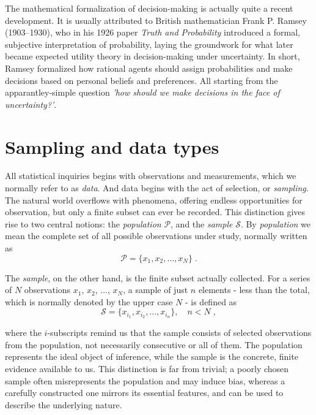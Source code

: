 \documentclass{book}
\begin{document}
\medskip

The mathematical formalization of decision-making is actually quite a recent development. It is usually attributed to British mathematician Frank P. Ramsey (1903–1930), who in his 1926 paper \textit{Truth and Probability} \cite{ramsey1926} introduced a formal, subjective interpretation of probability, laying the groundwork for what later became expected utility theory in decision-making under uncertainty. In short, Ramsey formalized how rational agents should assign probabilities and make decisions based on personal beliefs and preferences. All starting from the apparantley-simple question \textit{'how should we make decisions in the face of uncertainty?'}.\\

\section{Sampling and data types}
 
All statistical inquiries begins with observations and measurements, which we normally refer to as \textit{data}. And data begins with the act of selection, or \textit{sampling}. The natural world overflows with phenomena, offering endless opportunities for observation, but only a finite subset can ever be recorded. This distinction gives rise to two central notions: the \textit{population} $\mathcal{P}$, and the \textit{sample} $\mathcal{S}$. By \textit{population} we mean the complete set of all possible observations under study, normally written as 
\begin{equation}
	\mathcal{P} = \{x_1, x_2, \dots, x_N\} \; .
\end{equation}

The \textit{sample}, on the other hand, is the finite subset actually collected. For a series of $N$ observations $x_1$, $x_2$, ..., $x_N$, a sample of just $n$ elements - less than the total, which is normally denoted by the upper case $N$ - is defined as
\begin{equation}
	\mathcal{S} = \{x_{i_1}, x_{i_2}, \dots, x_{i_n}\}, \quad n < N \; ,
\end{equation}

where the $i$-subscripts remind us that the sample consists of selected observations from the population, not necessarily consecutive or all of them. The population represents the ideal object of inference, while the sample is the concrete, finite evidence available to us. This distinction is far from trivial; a poorly chosen sample often misrepresents the population and may induce bias, whereas a carefully constructed one mirrors its essential features, and can be used to describe the underlying nature.
\end{document}
